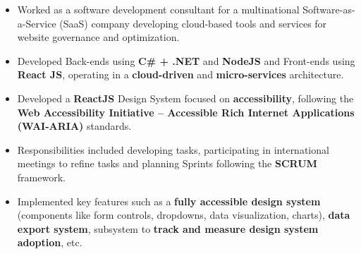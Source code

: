 \documentclass[10pt,a4paper,ragged2e]{altacv}
\begin{document}

\begin{fullwidth}
\makecvheader%
\end{fullwidth}



\begin{itemize}
	\item Worked as a software development consultant for a multinational Software-as-a-Service (SaaS) company developing cloud-based tools and services for website governance and optimization.
\item Developed Back-ends using \textbf{C\# + .NET} and \textbf{NodeJS} and Front-ends using \textbf{React JS}, operating in a \textbf{cloud-driven} and \textbf{micro-services} architecture.
	\item Developed a \textbf{ReactJS} Design System focused on \textbf{accessibility}, following the \textbf{Web Accessibility Initiative – Accessible Rich Internet Applications (WAI-ARIA)} standards.
	\item Responsibilities included developing tasks, participating in international meetings to refine tasks and planning Sprints following the \textbf{SCRUM} framework.
	\item Implemented key features such as a \textbf{fully accessible design system} (components like form controls, dropdowns, data visualization, charts), \textbf{data export system}, subsystem to \textbf{track and measure design system adoption}, etc.
\end{itemize}
\end{document}
